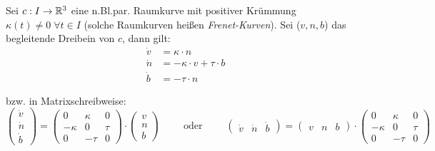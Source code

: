 \documentclass[11pt]{scrbook}
\begin{document}
\begin{st}
\label{7.7}

Sei $c: I \to \mathbb{R}^3$ eine n.Bl.par. Raumkurve mit positiver Krümmung $\kappa(t) \neq 0 \; \forall t \in I$ (solche Raumkurven heißen \emph{Frenet-Kurven}). Sei ($v, n, b$) das begleitende Dreibein von $c$, dann gilt:
\begin{align*}
\dot v &= \kappa \cdot n \\
\dot n &= - \kappa \cdot v + \tau \cdot b \\
\dot b &= - \tau \cdot n
\end{align*}

bzw. in Matrixschreibweise:
\[
\begin{pmatrix} \dot v \\ \dot n \\ \dot b \end{pmatrix} = \begin{pmatrix} 0 & \kappa & 0 \\ -\kappa & 0 & \tau \\ 0 & -\tau & 0   \end{pmatrix} \cdot \begin{pmatrix} v \\ n \\ b \end{pmatrix} \qquad \text{ oder } \qquad  \begin{pmatrix} \dot v & \dot n & \dot b \end{pmatrix} = \begin{pmatrix} v & n & b \end{pmatrix} \cdot \begin{pmatrix} 0 & \kappa & 0 \\ -\kappa & 0 & \tau \\ 0 & -\tau & 0   \end{pmatrix} \]


\end{st}
\end{document}
